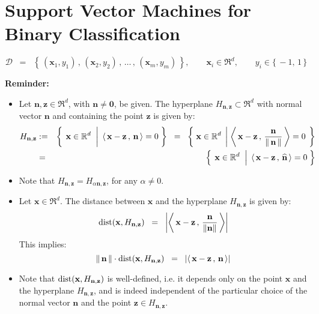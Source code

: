 
\section{Support Vector Machines for Binary Classification}
\setcounter{theorem}{0}

\begin{equation*}
\mathcal{D} \;\; = \;\; \left\{\,(\mathbf{x}_{1},y_{1})\,,\,(\mathbf{x}_{2},y_{2})\,,\,\ldots\,,\,(\mathbf{x}_{m},y_{m})\,\right\},
\quad\quad
\mathbf{x}_{i} \in \Re^{d},
\quad\quad
y_{i} \in \{\,-1,\,1\,\}
\end{equation*}

\vskip 0.3cm
\noindent
\textbf{Reminder:}
\begin{itemize}
\item  Let $\mathbf{n}, \mathbf{z} \in \Re^{d}$, with $\mathbf{n} \neq \mathbf{0}$, be given.
          The hyperplane $H_{\mathbf{n},\mathbf{z}} \subset \Re^{d}$ with normal vector $\mathbf{n}$ and
          containing the point $\mathbf{z}$ is given by: 
          \begin{eqnarray*}
          H_{\mathbf{n},\mathbf{z}}
          & := &
          \left\{\;
          	\left.
          	\mathbf{x}\overset{{\color{white}1}}{\in}\Re^{d}
		\;\;\right\vert\;
			\left\langle\,\mathbf{x}-\mathbf{z}\,,\,\mathbf{n}\,\right\rangle = 0
			\;\right\}
	\;\; = \;\;
	\left\{\;
		\mathbf{x}\in\Re^{d}
		\;\left\vert\;
			\left\langle\,\mathbf{x}-\mathbf{z}\,,\,\frac{\mathbf{n}}{\Vert\,\mathbf{n}\,\Vert}\,\right\rangle = 0
			\right.\;\right\}
	\\
	& = &
	\left\{\;
		\left.
		\mathbf{x}\overset{{\color{white}.}}{\in}\Re^{d}
		\;\;\right\vert\;
			\left\langle\,\mathbf{x}-\mathbf{z}\,,\,\widehat{\mathbf{n}}\,\right\rangle = 0
		\;\right\}
	\end{eqnarray*}
	
\item
	Note that $H_{\mathbf{n},\mathbf{z}} = H_{\alpha\mathbf{n},\mathbf{z}}$, for any $\alpha \neq 0$.
\item
	Let $\mathbf{x} \in \Re^{d}$.  The distance between $\mathbf{x}$ and the hyperplane $H_{\mathbf{n},\mathbf{z}}$
	is given by:
	\begin{equation*}
	\textnormal{dist}\!\left(\mathbf{x},H_{\mathbf{n},\mathbf{z}}\right) \;\; = \;\;
	\left\vert
	\left\langle\,\mathbf{x}-\mathbf{z}\,,\,\dfrac{\mathbf{n}}{\Vert\mathbf{n}\Vert}\,\right\rangle
	\right\vert
	\end{equation*}
	This implies:
	\begin{equation*}
	\Vert\,\mathbf{n}\,\Vert
	\cdot\textnormal{dist}\!\left(\mathbf{x},H_{\mathbf{n},\mathbf{z}}\right) \;\; = \;\;
	\left\vert\left\langle\,\mathbf{x}-\mathbf{z}\,,\,\mathbf{n}\,\right\rangle\right\vert
	\end{equation*}
\item
	Note that
	$\textnormal{dist}\!\left(\mathbf{x},H_{\mathbf{n},\mathbf{z}}\right)$ is well-defined,
	i.e. it depends only on the point $\mathbf{x}$ and the hyperplane
	$H_{\mathbf{n},\mathbf{z}}$, and is indeed independent of the particular choice
	of the normal vector $\mathbf{n}$ and the point
	$\mathbf{z} \in H_{\mathbf{n},\mathbf{z}}$. 
\end{itemize}

